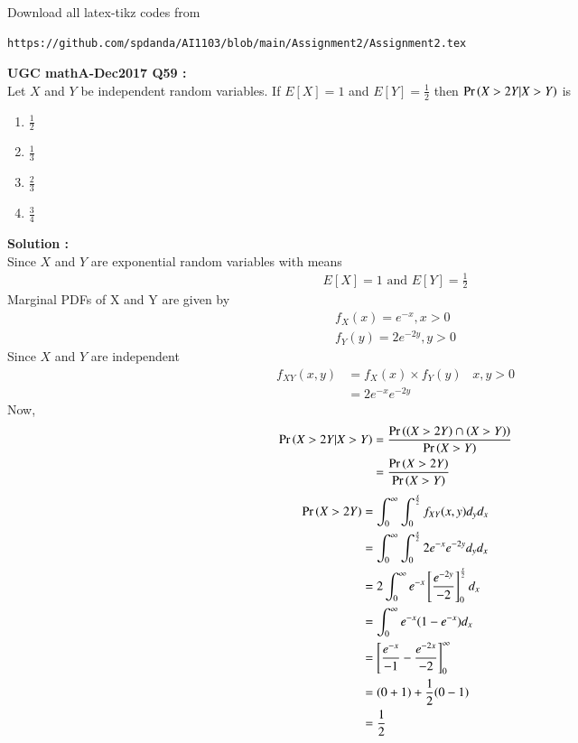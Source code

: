 \documentclass[journal,12pt,twocolumn]{IEEEtran}
\begin{document}
\maketitle
\newpage
\bigskip
\renewcommand{\thefigure}{\theenumi}
\renewcommand{\thetable}{\theenumi}
Download all latex-tikz codes from 
%
\begin{lstlisting}
https://github.com/spdanda/AI1103/blob/main/Assignment2/Assignment2.tex
\end{lstlisting}
\large\textbf{UGC mathA-Dec2017 Q59 :}\\
Let $X$ and $Y$ be independent random variables. If $E[X]=1$ and $E[Y]=\frac{1}{2}$ then $\Pr\left(X>2Y|X>Y\right)$ is
\begin{multicols}{2}
    \begin{enumerate}[label=\arabic*.]
        \item \Large$\frac{1}{2}$ \\
        \item $\frac{1}{3}$
        \item $\frac{2}{3}$ \\
        \item $\frac{3}{4}$
    \end{enumerate}
\end{multicols}
\textbf{Solution :}\\
Since $X$ and $Y$ are exponential random variables with means
\begin{align}
    E[X] = 1 \text{ and }
    E[Y] = \frac{1}{2}
\end{align}
Marginal PDFs of X and Y are given by
\begin{align}
    f_X(x)= e^{-x} , x>0 \\
    f_Y(y) = 2e^{-2y} , y>0
\end{align}
Since $X$ and $Y$ are independent
\begin{align}
    f_{XY}(x,y) &= f_X(x)\times f_Y(y) \;\;\;x,y >0 \\
                &= 2e^{-x}e^{-2y}
\end{align}
Now,
\begin{align}
    \Pr\left(X>2Y|X>Y\right) &= \dfrac{\Pr\left((X>2Y) \cap (X>Y)\right) }{\Pr\left(X>Y\right)}\\
                  &= \dfrac{\Pr\left(X>2Y\right)}{\Pr\left(X>Y\right)} \label{simul1}
\end{align}
\begin{align}
    \Pr\left(X>2Y\right) &= \int_{0}^{\infty}\int_{0}^{\frac{x}{2}} f_{XY}(x,y) d_yd_x \\
              &= \int_{0}^{\infty}\int_{0}^{\frac{x}{2}} 2e^{-x}e^{-2y}d_yd_x \\
              &= 2\int_{0}^{\infty} e^{-x} \left[\frac{e^{-2y}}{-2}\right]_0^{\frac{x}{2}}d_x\\
              &= \int_{0}^{\infty} e^{-x}(1-e^{-x})d_x\\
              &= \left[\frac{e^{-x}}{-1} - \frac{e^{-2x}}{-2}\right]_0^\infty\\
              &= (0+1) + \frac{1}{2}(0-1)\\
              &= \frac{1}{2} \label{simul2}
\end{align}
\end{document}
